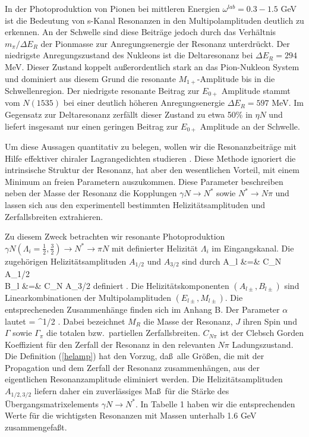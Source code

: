 In der Photoproduktion von Pionen bei mittleren Energien 
$\omega^{lab}= 0.3-1.5$ GeV ist die Bedeutung von s-Kanal Resonanzen
in den Multipolamplituden deutlich zu erkennen. 
An der Schwelle sind diese Beitr\"age jedoch durch das
Verh\"altnis $m_\pi/\Delta E_R$ der Pionmasse zur Anregungsenergie
der Resonanz unterdr\"uckt. Der niedrigste Anregungszustand des
Nukleons ist die Deltaresonanz bei $\Delta E_R =294$ MeV. Dieser
Zustand koppelt au\ss erordentlich stark an das Pion-Nukleon System
und dominiert aus diesem Grund die resonante $M_{1+}$-Amplitude
bis in die Schwellenregion. Der niedrigste resonante Beitrag zur
$E_{0+}$ Amplitude stammt vom $N(1535)$ bei einer deutlich h\"oheren
Anregungsenergie $\Delta E_R= 597$ MeV. Im Gegensatz zur Deltaresonanz
zerf\"allt dieser Zustand zu etwa 50\% in $\eta N$ und liefert 
insgesamt nur einen geringen Beitrag zur $E_{0+}$ Amplitude
an der Schwelle.

Um diese Aussagen quantitativ zu belegen, wollen wir die 
Resonanzbeitr\"age mit Hilfe effektiver chiraler Lagrangedichten studieren 
\cite{Pec69,OO75,NB80}. Diese Methode ignoriert die intrinsische 
Struktur der Resonanz, hat aber den wesentlichen Vorteil, mit einem
Minimum an freien Parametern auszukommen. Diese Parameter beschreiben
neben der Masse der Resonanz die Kopplungen $\gamma N\to N^{*}$ 
sowie $N^{*}\to N\pi$ und lassen sich aus den experimentell bestimmten
Helizit\"atsamplituden und Zerfallsbreiten extrahieren.

Zu diesem Zweck betrachten wir resonante Photoproduktion
$\gamma N(\Lambda_i=\frac{1}{2},\frac{3}{2}) \to N^{*} \to \pi N$
mit definierter Helizit\"at $\Lambda_i$ im Eingangskanal. Die
zugeh\"origen Helizit\"atsamplituden $A_{1/2}$ und $A_{3/2}$ sind durch
\beq
\label{helamp}
 A_{l\pm} &=& \mp \alpha C_{N\pi} A_{1/2}  \\
 B_{l\pm} &=& \pm {} C_{N\pi} A_{3/2}
\eeq
definiert \cite{PDG90}. Die Helizit\"atskomponenten $(A_{l\pm},B_{l\pm})$ 
sind Linearkombinationen der Multipolamplituden $(E_{l\pm},M_{l\pm})$.
Die entsprecheneden Zusammenh\"ange finden sich im Anhang B. Der
Parameter $\alpha$ lautet
\be
 \alpha = ^{1/2} \; .
\ee
Dabei bezeichnet $M_R$ die Masse der Resonanz, $J$ ihren Spin
und $\Gamma$ sowie $\Gamma_\pi$ die totalen bzw.~partiellen Zerfallsbreiten.
$C_{N\pi}$ ist der Clebsch Gorden Koeffizient f\"ur den Zerfall der 
Resonanz in den relevanten $N\pi$ Ladungszustand.  Die Definition
(\ref{helamp}) hat den Vorzug, da\ss\ alle Gr\"o\ss en, die mit der
Propagation und dem Zerfall der Resonanz zusammenh\"angen, aus
der  eigentlichen Resonanzamplitude eliminiert werden. Die 
Helizit\"atsamplituden $A_{1/2,3/2}$ liefern daher ein zuverl\"assiges
Ma\ss\ f\"ur die St\"arke des \"Ubergangsmatrixelements $\gamma N\to N^{*}$. 
In Tabelle 1 haben wir die entsprechenden Werte f\"ur die
wichtigsten Resonanzen mit Massen unterhalb 1.6 GeV zusammengefa\ss t. 
    
